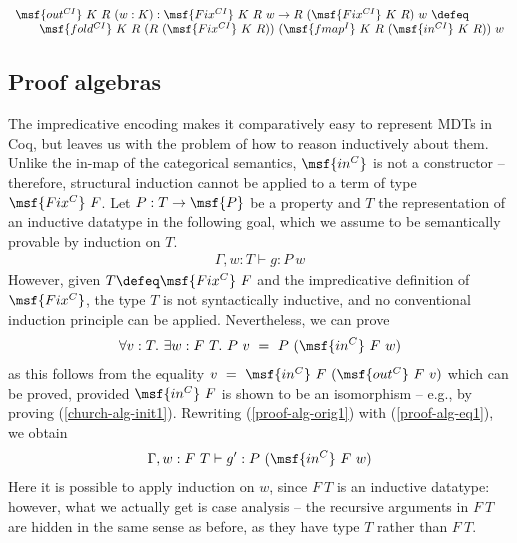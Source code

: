 \documentclass[submission,copyright,creativecommons]{eptcs}
\newcounter{prop}
\begin{document}
\begin{gather}
\begin{array}{lll}
\msf{out^{CI}} \ K \ R \ (w: K) : \msf{Fix^{CI}} \ K \ R \ w \to R
\ (\msf{Fix^{CI}} \ K \ R) \ w \ \defeq \\ \qquad \msf{fold^{CI}} \ K
\ R \ (R \ (\msf{Fix^{CI}} \ K \ R)) \ (\msf{fmap^{I}} \ K \ R 
\ (\msf{in^{CI}} \ K \ R)) \ w
\end{array}
\end{gather}



\subsection{Proof algebras}   \label{subsection:proof-algebras}

The impredicative encoding makes it comparatively easy to represent
MDTs in Coq, but leaves us with the problem of how to reason
inductively about them. Unlike the in-map of the categorical
semantics, $\msf{in^C}$ is not a constructor -- therefore, structural
induction cannot be applied to a term of type $\msf{Fix^C} \ F$. Let
$P: T \to \msf{P}$ be a property and $T$ the representation of an
inductive datatype in the following goal, which we assume to be
semantically provable by induction on $T$.
\begin{gather} \label{proof-alg-orig1}
\Gamma, w:T \vdash g: P \ w
\end{gather}
However, given $T \defeq \msf{Fix^C} \ F$ and the impredicative
definition of $\msf{Fix^C}$, the type $T$ is not syntactically
inductive, and no conventional induction principle can be
applied. Nevertheless, we can prove
\begin{gather} \label{proof-alg-eq1}
 \forall v:T. \ \exists w:F \ T. \ P \ v \ = \ P \ (\msf{in^C} \ F
 \ w)
\end{gather}
as this follows from the equality $v \ = \ \msf{in^C} \ F
\ (\msf{out^C} \ F \ v)$ which can be proved, provided $\msf{in^C}
\ F$ is shown to be an isomorphism -- e.g., by proving
(\ref{church-alg-init1}). Rewriting (\ref{proof-alg-orig1}) with
(\ref{proof-alg-eq1}), we obtain
\begin{gather}
\Gamma, w:F \ T \vdash g': P \ (\msf{in^C} \ F \ w)
\end{gather}
Here it is possible to apply induction on $w$, since $F \ T$ is an
inductive datatype: however, what we actually get is case analysis --
the recursive arguments in $F \ T$ are hidden in the same sense as
before, as they have type $T$ rather than $F \ T$.
\end{document}
